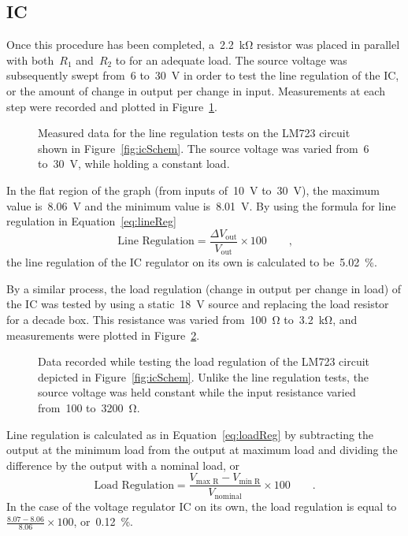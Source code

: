 \subsection{IC}
Once this procedure has been completed, a~\SI{2.2}{\kilo\ohm} resistor was
placed in parallel with both~$R_1$ and~$R_2$ to for an adequate load.  The
source voltage was subsequently swept from~6 to~\SI{30}{\volt} in order to test
the line regulation of the IC, or the amount of change in output per change in
input.  Measurements at each step were recorded and plotted in
Figure~\ref{fig:vrLineReg}.
%
\begin{figure}[H]
	\centering
	
	\parbox{4.25in}{
	\caption[Plot --- Line regulation of LM723]{Measured data for the line
	regulation tests on the LM723 circuit shown in Figure~\ref{fig:icSchem}.  The
	source voltage was varied from~6 to~\SI{30}{\volt}, while holding a constant
	load.}
	\label{fig:vrLineReg}
	}
\end{figure}
%
In the flat region of the graph (from inputs of~\SI{10}{\volt}
to~\SI{30}{\volt}), the maximum value is~\SI{8.06}{\volt} and the minimum value
is~\SI{8.01}{\volt}.  By using the formula for line regulation in
Equation~\eqref{eq:lineReg}
%
\begin{equation}
	\text{Line Regulation} = \frac{\Delta V_\text{out}}{V_\text{out}} \times 100 \qquad \text{,}
	\label{eq:lineReg}
\end{equation}
%
the line regulation of the IC regulator on its own is calculated to
be~\SI{5.02}{\percent}.

By a similar process, the load regulation (change in output per change in load)
of the IC was tested by using a static~\SI{18}{\volt} source and replacing the
load resistor for a decade box.  This resistance was varied from~\SI{100}{\ohm}
to~\SI{3.2}{\kilo\ohm}, and measurements were plotted in
Figure~\ref{fig:vrLoadReg}.
%
\begin{figure}[H]
	\centering
	
	\parbox{4.25in}{
	\caption[Plot -- Load regulation of LM723]{Data recorded while testing the
	load regulation of the LM723 circuit depicted in Figure~\ref{fig:icSchem}.
	Unlike the line regulation tests, the source voltage was held constant
	while the input resistance varied from~100 to~\SI{3200}{\ohm}.}
	\label{fig:vrLoadReg}
	}
\end{figure}
%
Line regulation is calculated as in Equation~\eqref{eq:loadReg} by subtracting
the output at the minimum load from the output at maximum load and dividing the
difference by the output with a nominal load, or
%
\begin{equation}
	\text{Load Regulation} = \frac{V_\text{max R} - V_\text{min R}}{V_\text{nominal}} \times 100 \qquad \text{.}
	\label{eq:loadReg}
\end{equation}
%
In the case of the voltage regulator IC on its own, the load regulation is
equal to~$\frac{8.07-8.06}{8.06} \times 100$, or~\SI{0.12}{\percent}.


